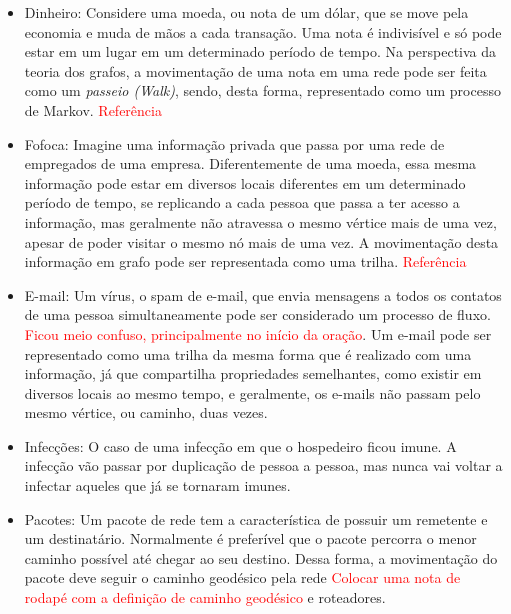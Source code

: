 \begin{itemize}
\item Dinheiro: Considere uma moeda, ou nota de um dólar, que se move pela
economia e muda de mãos a cada transação. Uma nota é indivisível e só pode estar em um lugar em um determinado período de tempo. Na perspectiva da teoria dos grafos, a movimentação de uma nota em uma rede pode ser feita como um \textit{passeio (Walk)}, sendo, desta forma, representado como um processo de Markov. \textcolor{red}{Referência}
\item Fofoca: Imagine uma informação privada que passa por uma rede
de empregados de uma empresa. Diferentemente de uma moeda, essa mesma informação pode estar em diversos locais diferentes em um determinado período de tempo, se replicando a cada pessoa que passa a ter acesso a informação, mas geralmente não atravessa o mesmo vértice mais de uma vez, apesar de poder visitar o mesmo nó mais de uma vez. A movimentação desta informação em grafo pode ser representada como uma trilha. \textcolor{red}{Referência}
\item E-mail: Um vírus, o spam de e-mail, que envia mensagens a todos os
contatos de uma pessoa simultaneamente pode ser considerado um processo de fluxo. \textcolor{red}{Ficou meio confuso, principalmente no início da oração}. Um e-mail pode ser representado como uma trilha da mesma forma que é realizado com uma informação, já que compartilha propriedades semelhantes, como existir em diversos locais ao mesmo tempo, e geralmente, os e-mails não passam pelo mesmo vértice, ou caminho, duas vezes.
\item Infecções: O caso de uma infecção em que o hospedeiro ficou imune.
A infecção vão passar por duplicação de pessoa a pessoa, mas nunca vai voltar a infectar aqueles que já se tornaram imunes.
\item Pacotes: Um pacote de rede tem a característica de possuir
um remetente e um destinatário. Normalmente é preferível que o pacote percorra o menor caminho possível até chegar ao seu destino. Dessa forma, a movimentação do pacote deve seguir o caminho geodésico pela rede \textcolor{red}{Colocar uma nota de rodapé com a definição de caminho geodésico} e roteadores. 
\end{itemize}


